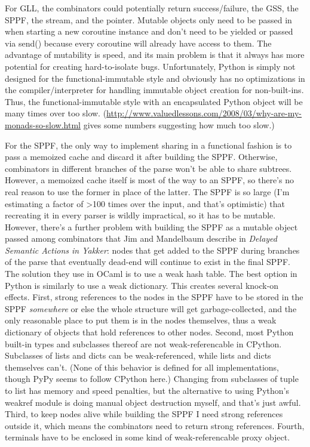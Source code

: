 \documentclass[12pt]{article}
\begin{document}
For GLL, the combinators could potentially return success/failure, the
GSS, the SPPF, the stream, and the pointer.  Mutable objects only need
to be passed in when starting a new coroutine instance and don't need
to be yielded or passed via send() because every coroutine will
already have access to them.  The advantage of mutability is speed,
and its main problem is that it always has more potential for creating
hard-to-isolate bugs.  Unfortunately, Python is simply not designed
for the functional-immutable style and obviously has no optimizations
in the compiler/interpreter for handling immutable object creation for
non-built-ins.  Thus, the functional-immutable style with an
encapsulated Python object will be many times over too slow.
(\url{http://www.valuedlessons.com/2008/03/why-are-my-monads-so-slow.html}
gives some numbers suggesting how much too slow.)

For the SPPF, the only way to implement sharing in a functional
fashion is to pass a memoized cache and discard it after building the
SPPF.  Otherwise, combinators in different branches of the parse won't
be able to share subtrees.  However, a memoized cache itself is most
of the way to an SPPF, so there's no real reason to use the former in
place of the latter.  The SPPF is so large (I'm estimating a factor of
>100 times over the input, and that's optimistic) that recreating it
in every parser is wildly impractical, so it has to be mutable.
However, there's a further problem with building the SPPF as a mutable
object passed among combinators that Jim and Mandelbaum describe in
\emph{Delayed Semantic Actions in Yakker}: nodes that get added to the
SPPF during branches of the parse that eventually dead-end will
continue to exist in the final SPPF.  The solution they use in OCaml
is to use a weak hash table.  The best option in Python is similarly
to use a weak dictionary.  This creates several knock-on effects.
First, strong references to the nodes in the SPPF have to be stored in
the SPPF \emph{somewhere} or else the whole structure will get
garbage-collected, and the only reasonable place to put them is in the
nodes themselves, thus a weak dictionary of objects that hold
references to other nodes.  Second, most Python built-in types and
subclasses thereof are not weak-referencable in CPython.  Subclasses
of lists and dicts can be weak-referenced, while lists and dicts
themselves can't.  (None of this behavior is defined for all
implementations, though PyPy seems to follow CPython here.)  Changing
from subclasses of tuple to list has memory and speed penalties, but
the alternative to using Python's weakref module is doing manual
object destruction myself, and that's just awful.  Third, to keep
nodes alive while building the SPPF I need strong references outside
it, which means the combinators need to return strong references.
Fourth, terminals have to be enclosed in some kind of
weak-referencable proxy object.
\end{document}
